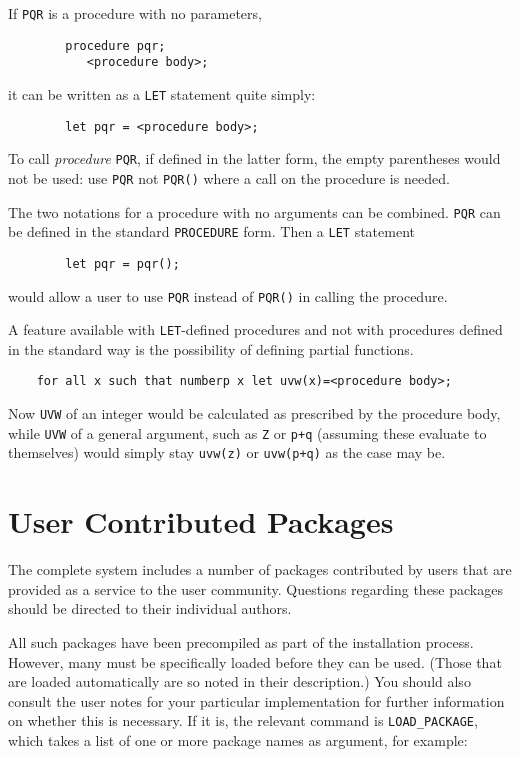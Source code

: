 If {\tt PQR} is a procedure with no parameters,
\begin{verbatim}
        procedure pqr;
           <procedure body>;
\end{verbatim}
it can be written as a {\tt LET} statement quite simply:
\begin{verbatim}
        let pqr = <procedure body>;
\end{verbatim}
To call {\em procedure\/} {\tt PQR}, if defined in the latter form, the empty
parentheses would not be used: use {\tt PQR} not {\tt PQR()} where a call
on the procedure is needed.

The two notations for a procedure with no arguments can be combined. {\tt PQR}
can be defined in the standard {\tt PROCEDURE} form. Then a {\tt LET}
statement
\begin{verbatim}
        let pqr = pqr();
\end{verbatim}
would allow a user to use {\tt PQR} instead of {\tt PQR()} in calling the
procedure.

A feature available with {\tt LET}-defined procedures and not with procedures
defined in the standard way is the possibility of defining partial
functions.
\begin{verbatim}
    for all x such that numberp x let uvw(x)=<procedure body>;
\end{verbatim}
Now {\tt UVW} of an integer would be calculated as prescribed by the procedure
body, while {\tt UVW} of a general argument, such as {\tt Z} or {\tt p+q}
(assuming these evaluate to themselves) would simply stay {\tt uvw(z)}
or {\tt uvw(p+q)} as the case may be.

\chapter{User Contributed Packages} 
\label{chap-user}
The complete {\REDUCE} system includes a number of packages contributed by
users that are provided as a service to the user community.  Questions
regarding these packages should be directed to their individual authors.

All such packages have been precompiled as part of the installation process.
However, many must be specifically loaded before they can be used. (Those
that are loaded automatically are so noted in their description.) You should
also consult the user notes for your particular implementation for further
information on whether this is necessary.  If it is, the relevant command is
{\tt LOAD\_PACKAGE}, which takes a list of one or
more package names as argument, for example:

